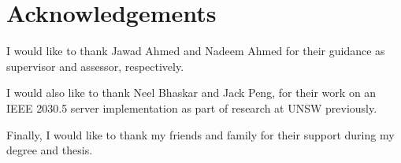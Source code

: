 \chapter*{Acknowledgements}\label{Acknowledgements}
I would like to thank Jawad Ahmed and Nadeem Ahmed for their guidance as supervisor and assessor, respectively.

I would also like to thank Neel Bhaskar and Jack Peng, for their work on an IEEE 2030.5 server implementation as part of research at UNSW previously.

Finally, I would like to thank my friends and family for their support during my degree and  thesis.
